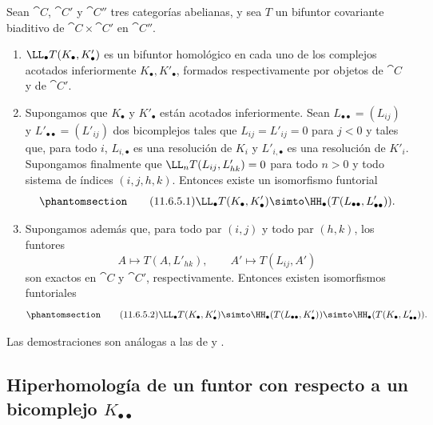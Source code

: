 \documentclass[oneside]{amsart}
\let\EGAOriginalLabel\label
\renewcommand{\label}[1]{\phantomsection\EGAOriginalLabel{#1}}
\begin{document}
\begin{proposition}[11.6.5]
\label{0.11.6.5}
Sean $\cat{C}$, $\cat{C}'$ y $\cat{C}''$ tres categorías abelianas, y sea $T$ un bifuntor covariante biaditivo de $\cat{C}\times\cat{C}'$ en $\cat{C}''$.
\begin{enumerate}
  \item[{\rm(i)}] {$\LL_\bullet T(K_\bullet,K'_\bullet)$ es un bifuntor homológico en cada uno de los complejos acotados inferiormente $K_\bullet,K'_\bullet$, formados respectivamente por objetos de $\cat{C}$ y de $\cat{C}'$.}

  \item[{\rm(ii)}] {Supongamos que $K_\bullet$ y $K'_\bullet$ están acotados inferiormente.
  Sean $L_{\bullet\bullet}=(L_{ij})$ y $L'_{\bullet\bullet}=(L'_{ij})$ dos bicomplejos tales que $L_{ij}=L'_{ij}=0$ para $j<0$ y tales que, para todo $i$, $L_{i,\bullet}$ es una resolución de $K_i$ y $L'_{i,\bullet}$ es una resolución de $K'_i$.
  Supongamos finalmente que $\LL_nT(L_{ij},L'_{hk})=0$ para todo $n>0$ y todo sistema de índices $(i,j,h,k)$.
  Entonces existe un isomorfismo funtorial}
  \[
  \label{0.11.6.5.1}
  \tag{11.6.5.1}
    \LL_\bullet T(K_\bullet,K'_\bullet)
    \simto
    \HH_\bullet(T(L_{\bullet\bullet},L'_{\bullet\bullet})).
  \]

  \item[{\rm(iii)}] {Supongamos además que, para todo par $(i,j)$ y todo par $(h,k)$, los funtores
  \[
    A\longmapsto T(A,L'_{hk}),
    \qquad
    A'\longmapsto T(L_{ij},A')
  \]
  son exactos en $\cat{C}$ y $\cat{C}'$, respectivamente.
  Entonces existen isomorfismos funtoriales}
  \[
  \label{0.11.6.5.2}
  \tag{11.6.5.2}
    \LL_\bullet T(K_\bullet,K'_\bullet)
    \simto
    \HH_\bullet(T(L_{\bullet\bullet},K'_\bullet))
    \simto
    \HH_\bullet(T(K_\bullet,L'_{\bullet\bullet})).
  \]
\end{enumerate}

\upshape Las demostraciones son análogas a las de  y .
\end{proposition}

\subsection{Hiperhomología de un funtor con respecto a un bicomplejo $K_{\bullet\bullet}$}
\label{subsection:0.11.7}
\end{document}

